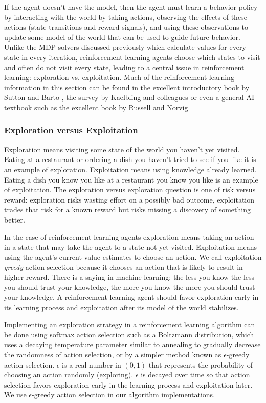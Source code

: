 If the agent doesn't have the model, then the agent must learn a behavior policy by interacting with the world by taking actions, observing the effects of these actions (state transitions and reward signals), and using these observations to update some model of the world that can be used to guide future behavior. Unlike the MDP solvers discussed previously which calculate values for every state in every iteration, reinforcement learning agents choose which states to visit and often do not visit every state, leading to a central issue in reinforcement learning: exploration vs. exploitation. Much of the reinforcement learning information in this section can be found in the excellent introductory book by Sutton and Barto \cite{sutton1998reinforcement}, the survey by Kaelbling and colleagues \cite{kaelbling1996reinforcement} or even a general AI textbook such as the excellent book by Russell and Norvig \cite{russell2003artificial}

\subsubsection{Exploration versus Exploitation}

Exploration means visiting some state of the world you haven't yet visited. Eating at a restaurant or ordering a dish you haven't tried to see if you like it is an example of exploration. Exploitation means using knowledge already learned. Eating a dish you know you like at a restaurant you know you like is an example of exploitation. The exploration versus exploration question is one of risk versus reward: exploration risks wasting effort on a possibly bad outcome, exploitation trades that risk for a known reward but risks missing a discovery of something better.

In the case of reinforcement learning agents exploration means taking an action in a state that may take the agent to a state not yet visited. Exploitation means using the agent's current value estimates to choose an action. We call exploitation {\it greedy} action selection because it chooses an action that is likely to result in higher reward. There is a saying in machine learning: the less you know the less you should trust your knowledge, the more you know the more you should trust your knowledge. A reinforcement learning agent should favor exploration early in its learning process and exploitation after its model of the world stabilizes.

Implementing an exploration strategy in a reinforcement learning algorithm can be done using softmax action selection such as a Boltzmann distribution, which uses a decaying temperature parameter similar to annealing to gradually decrease the randomness of action selection, or by a simpler method known as $\epsilon$-greedy action selection.  $\epsilon$ is a real number in $(0, 1)$ that represents the probability of choosing an action randomly (exploring). $\epsilon$ is decayed over time so that action selection favors exploration early in the learning process and exploitation later. We use $\epsilon$-greedy action selection in our algorithm implementations.

